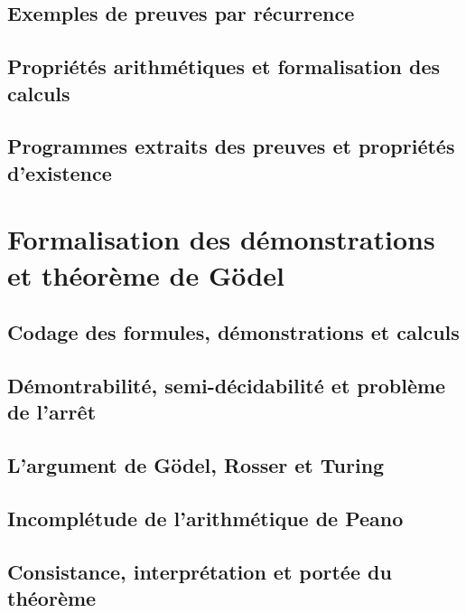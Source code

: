 \subsection{Exemples de preuves par récurrence}
\subsection{Propriétés arithmétiques et formalisation des calculs}
\subsection{Programmes extraits des preuves et propriétés d'existence}

\section{Formalisation des démonstrations et théorème de Gödel}
\subsection{Codage des formules, démonstrations et calculs}
\subsection{Démontrabilité, semi-décidabilité et problème de l'arrêt}
\subsection{L'argument de Gödel, Rosser et Turing}
\subsection{Incomplétude de l'arithmétique de Peano}
\subsection{Consistance, interprétation et portée du théorème}
